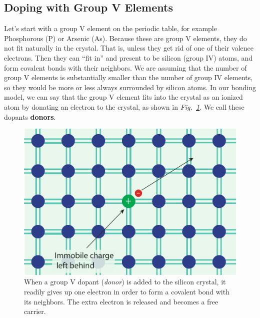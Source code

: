 \subsection{Doping with Group V Elements}
Let’s start with a group V element on the periodic table, for example Phosphorous (P) or Arsenic (As).  Because these are group V elements, they do not fit naturally in the crystal.  That is, unless they get rid of one of their valence electrons.  Then they can “fit in” and present to be silicon (group IV) atoms, and form covalent bonds with their neighbors.  We are assuming that the number of group V elements is substantially smaller than the number of group IV elements, so they would be more or less always surrounded by silicon atoms.  In our bonding model, we can say that the group V element fits into the crystal as an ionized atom by donating an electron to the crystal, as shown in \emph{Fig.~\ref{fig:silicoN_Dopant_V}}.   We call these dopants \textbf{donors}.
\begin{figure}[tb]
\centering
\includegraphics[width=.5\columnwidth]{silicoN_Dopant_V}
\caption{When a group V dopant (\emph{donor}) is added to the silicon crystal, it readily gives up one electron in order to form a covalent bond with its neighbors.  The extra electron is released and becomes a free carrier.}
\label{fig:silicoN_Dopant_V}
\end{figure}
